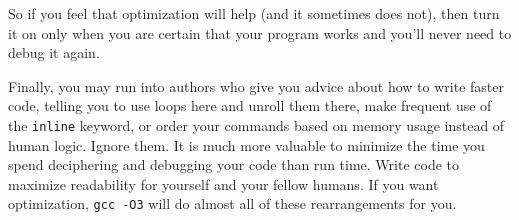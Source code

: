 \documentclass[12pt]{article}
\begin{document}
So if you feel that optimization will help (and it sometimes does not),
then turn it on only when you are certain that your program works and
you'll never need to debug it again.

Finally, you may run into authors who give you advice about how to write
faster code, telling you to use loops here and unroll them there, make
frequent use of the {\tt inline} keyword, or order your commands based
on memory usage instead of human logic. Ignore them. It is much more
valuable to minimize the time you spend deciphering and debugging your
code than run time.  Write code to maximize readability for yourself
and your fellow humans. If you want optimization, {\tt gcc -O3} will
do almost all of these rearrangements for you.

\label{end_c_crash}
\ifbook \else
\printindex
\end{document}
